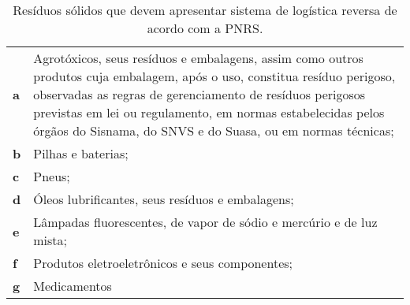 \begin{table}[htbp]
  \centering
  \caption{Resíduos sólidos que devem apresentar sistema de logística reversa de acordo com a PNRS.}
    \begin{tabular}{p{4.215em}|p{34.43em}}
    \rowcolor[rgb]{ .957,  .69,  .514} \textbf{a} & Agrotóxicos, seus resíduos e embalagens, assim como outros produtos cuja embalagem, após o uso, constitua resíduo perigoso, observadas as regras de gerenciamento de resíduos perigosos previstas em lei ou regulamento, em normas estabelecidas pelos órgãos do Sisnama, do SNVS e do Suasa, ou em normas técnicas; \\
    \rowcolor[rgb]{ .984,  .894,  .835} \textbf{b} &       Pilhas e baterias; \\
    \rowcolor[rgb]{ .957,  .69,  .514} \textbf{c} & Pneus; \\
    \rowcolor[rgb]{ .984,  .894,  .835} \textbf{d} & Óleos lubrificantes, seus resíduos e embalagens; \\
    \rowcolor[rgb]{ .957,  .69,  .514} \textbf{e} & Lâmpadas fluorescentes, de vapor de sódio e mercúrio e de luz mista; \\
    \rowcolor[rgb]{ .984,  .894,  .835} \textbf{f} & Produtos eletroeletrônicos e seus componentes; \\
    \rowcolor[rgb]{ .957,  .69,  .514} \textbf{g} & Medicamentos \\
    \end{tabular}%
  \label{tab:logistica_reversa}%
\end{table}%
